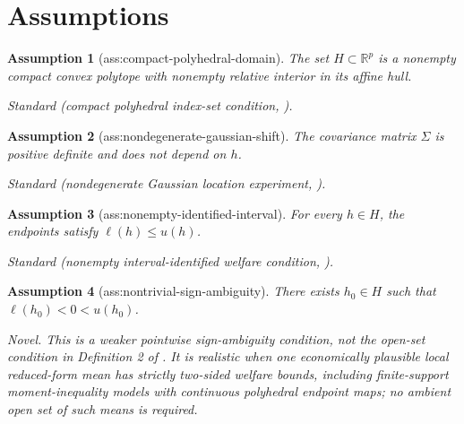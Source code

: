 \documentclass{article}
\newtheorem{assumption}{Assumption}
\begin{document}
\section{Assumptions}

\begin{assumption}[ass:compact-polyhedral-domain]\label{ass:compact-polyhedral-domain}
The set \(H\subset\mathbb R^p\) is a nonempty compact convex polytope with nonempty relative interior in its affine hull.
\par\smallskip\noindent\emph{Standard} (compact polyhedral index-set condition, \cite{ZhangWuLopez2010Exchange}).
\end{assumption}

\begin{assumption}[ass:nondegenerate-gaussian-shift]\label{ass:nondegenerate-gaussian-shift}
The covariance matrix \(\Sigma\) is positive definite and does not depend on \(h\).
\par\smallskip\noindent\emph{Standard} (nondegenerate Gaussian location experiment, \cite{Yata2025Optimal}).
\end{assumption}

\begin{assumption}[ass:nonempty-identified-interval]\label{ass:nonempty-identified-interval}
For every \(h\in H\), the endpoints satisfy \(\ell(h)\le u(h)\).
\par\smallskip\noindent\emph{Standard} (nonempty interval-identified welfare condition, \cite{MontielOleaQiuStoye2026Local}).
\end{assumption}

\begin{assumption}[ass:nontrivial-sign-ambiguity]\label{ass:nontrivial-sign-ambiguity}
There exists \(h_0\in H\) such that \(\ell(h_0)<0<u(h_0)\).
\par\smallskip\noindent\emph{Novel.} This is a weaker pointwise sign-ambiguity condition, not the open-set condition in Definition 2 of \cite{MontielOleaQiuStoye2026Decision}. It is realistic when one economically plausible local reduced-form mean has strictly two-sided welfare bounds, including finite-support moment-inequality models with continuous polyhedral endpoint maps; no ambient open set of such means is required.
\end{assumption}
\end{document}
